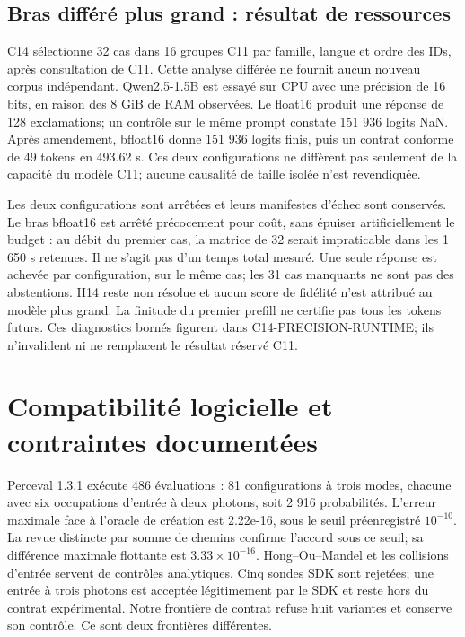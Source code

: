 \documentclass[11pt]{article}
\begin{document}
\subsection{Bras différé plus grand : résultat de ressources}

C14 sélectionne 32 cas dans 16 groupes C11 par famille, langue et ordre des IDs, après consultation de C11. Cette analyse différée ne fournit aucun nouveau corpus indépendant. Qwen2.5-1.5B est essayé sur CPU avec une précision de 16 bits, en raison des 8 GiB de RAM observées. Le float16 produit une réponse de 128 exclamations; un contrôle sur le même prompt constate 151 936 logits NaN. Après amendement, bfloat16 donne 151 936 logits finis, puis un contrat conforme de 49 tokens en 493.62 s. Ces deux configurations ne diffèrent pas seulement de la capacité du modèle C11; aucune causalité de taille isolée n'est revendiquée.

Les deux configurations sont arrêtées et leurs manifestes d'échec sont conservés. Le bras bfloat16 est arrêté précocement pour coût, sans épuiser artificiellement le budget : au débit du premier cas, la matrice de 32 serait impraticable dans les 1 650 s retenues. Il ne s'agit pas d'un temps total mesuré. Une seule réponse est achevée par configuration, sur le même cas; les 31 cas manquants ne sont pas des abstentions. H14 reste non résolue et aucun score de fidélité n'est attribué au modèle plus grand. La finitude du premier prefill ne certifie pas tous les tokens futurs. Ces diagnostics bornés figurent dans C14-PRECISION-RUNTIME; ils n'invalident ni ne remplacent le résultat réservé C11.

\section{Compatibilité logicielle et contraintes documentées}

Perceval 1.3.1 exécute 486 évaluations : 81 configurations à trois modes, chacune avec six occupations d'entrée à deux photons, soit 2 916 probabilités. L'erreur maximale face à l'oracle de création est 2.22e-16, sous le seuil préenregistré $10^{-10}$. La revue distincte par somme de chemins confirme l'accord sous ce seuil; sa différence maximale flottante est $3.33\times10^{-16}$. Hong–Ou–Mandel et les collisions d'entrée servent de contrôles analytiques. Cinq sondes SDK sont rejetées; une entrée à trois photons est acceptée légitimement par le SDK et reste hors du contrat expérimental. Notre frontière de contrat refuse huit variantes et conserve son contrôle. Ce sont deux frontières différentes.
\end{document}
